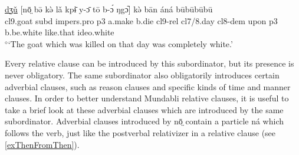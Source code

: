 \documentclass[10pt,twoside]{article}
\def\ci#1{{\ipaFont #1}}
\newcommand{\gl}[1]{`#1'}
\def\VSP{\vspace{0pt}}
\newcommand{\cl}[1]{{\sc cl#1}}
\def\elicited{$^\diamond$}
\newcommand{\comment}[1]{\textcolor{blue}{\emph{#1}}}
\begin{document}
\begin{exe} 
	\ex \label{exGoatTheyKilled1}	
		\gll	\uline{dʒǔ} [nō̤ bə̄ kə̀ lǎ kpɨ̄ y-ɔ̄ tō b-ɔ́ ŋgɔ᷆] kə̀ bān áná būbūbūbū			\\
			\cl9.goat {\sc subd} {\sc impers.pro} {\sc p3} a.make b.die \cl9-{\sc rel} \cl7/8.day \cl8-{\sc dem} upon {\sc p3} b.be.white like.that {\sc ideo}.white		\\
		\glt \VSP \elicited \gl{The goat which was killed on that day was completely white.}
\end{exe}%

\noindent
Every relative clause can be introduced by this subordinator, but its presence is never obligatory.
%
The same subordinator also obligatorily introduces certain adverbial clauses, 
such as reason clauses and specific kinds of time and manner clauses. In order to better understand 
Mundabli relative clauses, it is useful to take a brief look at these adverbial clauses which are 
introduced by the same subordinator. Adverbial clauses introduced by \ci{nō̤} contain a 
particle \ci{ná} which follows the verb, just like the postverbal relativizer in a 
relative clause (see \ref{exThenFromThen}).
%
\end{document}
